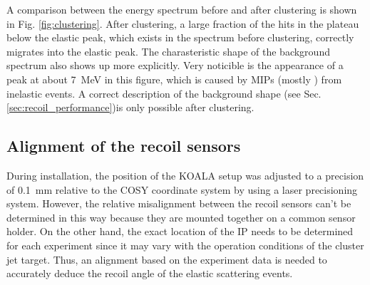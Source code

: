 \documentclass[number,5p]{elsarticle}
\begin{document}
A comparison between the energy spectrum before and after clustering is shown in Fig. \ref{fig:clustering}.
After clustering, a large fraction of the hits in the plateau below the elastic peak, which exists in the spectrum before clustering, correctly migrates into the elastic peak.
The charasteristic shape of the background spectrum also shows up more explicitly.
Very noticible is the appearance of a peak at about \SI{7}{\MeV} in this figure,
which is caused by MIPs (mostly \Pgppm) from inelastic events.
A correct description of the background shape (see Sec. \ref{sec:recoil_performance})is only possible after clustering.

\subsection{Alignment of the recoil sensors}
\label{sec:alignment}

During installation, the position of the KOALA setup was adjusted to a precision
of \SI{0.1}{\mm} relative to the COSY coordinate system by using a laser precisioning system.
However, the relative misalignment between the recoil sensors can't be
determined in this way because they are mounted together on a common sensor holder.
On the other hand, the exact location of the IP needs to be determined for each experiment since
it may vary with the operation conditions of the cluster jet target.
Thus, an alignment based on the experiment data is needed to accurately deduce the recoil angle of the elastic scattering events.
\end{document}

